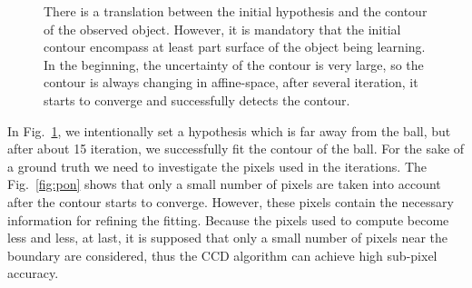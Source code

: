 \begin{figure}[htbp]
  \begin{minipage}[t]{0.5\linewidth} 
    \centering 
  \end{minipage} 
\caption[Segmentation of a ball]{There is a translation between the
  initial hypothesis and the contour of the observed object. However, it is
  mandatory that the initial contour encompass at least part surface
  of the object being learning. In the beginning, the uncertainty of
  the contour is very large, so the contour is always changing in
  affine-space, after several iteration, it starts to converge and
  successfully detects the contour.
\label{fig:sab}
}
\end{figure}

In Fig.~\ref{fig:sab}, we intentionally set a hypothesis which is far away
from the ball, but after about 15 iteration, we successfully fit the
contour of the ball. For the sake of a ground truth we need
to investigate the pixels used in the iterations. The Fig.~\ref{fig:pon} shows
that only a small number of pixels are taken into account after the
contour starts to converge. However, these pixels contain the
necessary information for refining the fitting. Because the pixels used
to compute become less and less, at last, it is supposed that
only a small number of pixels near the boundary are considered, thus the
CCD algorithm can achieve high sub-pixel accuracy.

